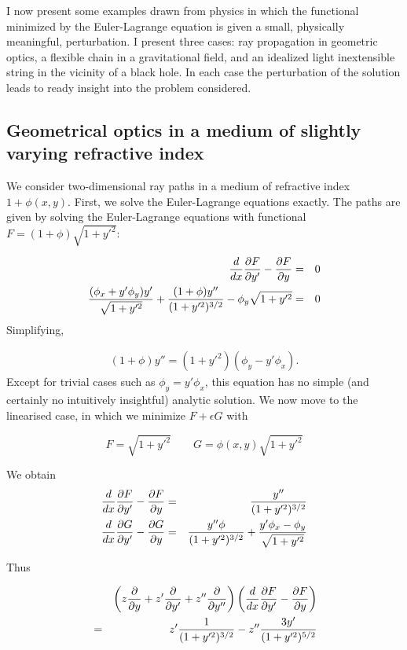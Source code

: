 \documentclass[pdflatex,sn-mathphys-num]{sn-jnl}%
\theoremstyle{thmstyleone}%
\theoremstyle{thmstyletwo}%
\theoremstyle{thmstylethree}%
\begin{document}
I now present some examples drawn from physics in which the functional
minimized by the Euler-Lagrange equation is given a small, physically
meaningful, perturbation.  I present three cases: ray propagation in
geometric optics, a flexible chain in a gravitational field, and an
idealized light inextensible string in the vicinity of a black hole.
In each case the perturbation of the solution leads to ready insight
into the problem considered.

\subsection{Geometrical optics in a medium of slightly varying refractive index}

We consider two-dimensional ray paths in a medium of refractive index
$1+\phi(x,y)$.  First, we solve the Euler-Lagrange equations exactly.
The paths are given by solving the Euler-Lagrange equations with
functional $F=(1+\phi)\sqrt{1+y'^2}$:

\begin{eqnarray}
  \frac{d}{dx}\frac{\partial{F}}{\partial{y'}}-\frac{\partial{F}}{\partial{y}} &=& 0\nonumber\\
  \frac{(\phi_x+y'\phi_y)y'}{\sqrt{1+y'^2}}+\frac{(1+\phi)y''}{(1+y'^2)^{3/2}} -
  \phi_y\sqrt{1+y'^2} &=& 0
\end{eqnarray}
%
Simplifying,

\begin{eqnarray}
 (1+\phi) y'' = (1+y'^2)(\phi_y - y'\phi_x).
\end{eqnarray}
%
Except for trivial cases such as $\phi_y=y'\phi_x$, this equation has
no simple (and certainly no intuitively insightful) analytic solution.
We now move to the linearised case, in which we minimize $F+\epsilon G$ with

\begin{equation}F=\sqrt{1+y'^2}\qquad
  G=\phi(x,y)\sqrt{1+y'^2}
\end{equation}

We obtain
\begin{eqnarray}
  \frac{d}{dx}\frac{\partial{F}}{\partial{y'}} - \frac{\partial{F}}{\partial{y}} &=& \frac{y''}{(1+y'^2)^{3/2}}\nonumber\\
  \frac{d}{dx}\frac{\partial{G}}{\partial{y'}} - \frac{\partial{G}}{\partial{y}} &=& \frac{y''\phi}{(1+y'^2)^{3/2}} + \frac{y'\phi_x - \phi_y}{\sqrt{1+y'^2}}
\end{eqnarray}

Thus

\begin{eqnarray}
&{}& \left(z\frac{\partial{}}{\partial{y}} + z'\frac{\partial{}}{\partial{y'}} + z''\frac{\partial{}}{\partial{y''}}\right)\left(\frac{d}{dx}\frac{\partial{F}}{\partial{y'}} - \frac{\partial{F}}{\partial{y}}\right)\nonumber\\
&=&  z'\frac{1}{(1+y'^2)^{3/2}} -z''\frac{3y'}{(1+y'^2)^{5/2}}
\end{eqnarray}
\end{document}
